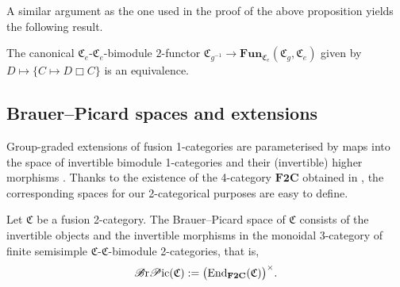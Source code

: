 A similar argument as the one used in the proof of the above proposition yields the following result.

\begin{Corollary}\label{cor:invertibledual}
The canonical $\mathfrak{C}_e$-$\mathfrak{C}_e$-bimodule $2$-functor $\mathfrak{C}_{g^{-1}}\rightarrow \mathbf{Fun}_{\mathfrak{C}_e}(\mathfrak{C}_g,\mathfrak{C}_e)$ given by $D\mapsto \{C\mapsto D\Box C\}$ is an equivalence.
\end{Corollary}

\subsection{Brauer--Picard spaces and extensions}

Group-graded extensions of fusion 1-categories are parameterised by maps into the space of invertible bimodule 1-categories and their (invertible) higher morphisms \cite{ENO2}. Thanks to the existence of the 4-category $\mathbf{F2C}$ obtained in \cite{D10}, the corresponding spaces for our 2-categorical purposes are easy to define.

\begin{Definition}
Let $\mathfrak{C}$ be a fusion 2-category. The Brauer--Picard space of $\mathfrak{C}$ consists of the invertible objects and the invertible morphisms in the monoidal 3-category of finite semisimple $\mathfrak{C}$-$\mathfrak{C}$-bimodule 2-categories, that is, \begin{gather*}\mathscr{B}{\rm r}\mathscr{P}{\rm ic}(\mathfrak{C}):=\big(\mathbf{\operatorname{End}}_{\mathbf{F2C}}(\mathfrak{C})\big)^{\times}.\end{gather*}
\end{Definition}

